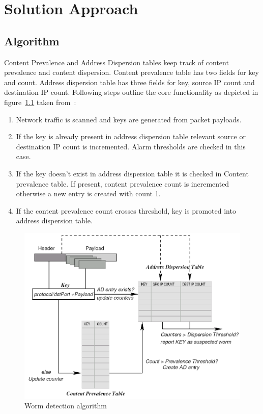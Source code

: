 \documentclass{report}
\begin{document}
\chapter{Solution Approach}

\section{Algorithm}
Content Prevalence and Address Dispersion tables keep track of content prevalence and content dispersion. Content prevalence table has two fields for key and count. Address dispersion table has three fields for key, source IP count and destination IP count. Following steps outline the core functionality as depicted in figure~\ref{Algorithm} taken from~\cite{DBLP:conf/osdi/SinghEVS04}:
\begin{enumerate}
\item Network traffic is scanned and keys are generated from packet payloads.
\item If the key is already present in address dispersion table relevant source or destination IP count is incremented. Alarm thresholds are checked in this case.
\item If the key doesn't exist in address dispersion table it is checked in Content prevalence table. If present, content prevalence count is incremented otherwise a new entry is created with count 1. 
\item If the content prevalence count crosses threshold, key is promoted into address dispersion table.
\end{enumerate}

\begin{figure}[here]
\centering
\includegraphics[width=\textwidth]{Algorithm.png}
\caption{Worm detection algorithm}
\label{Algorithm}
\end{figure}
\end{document}
